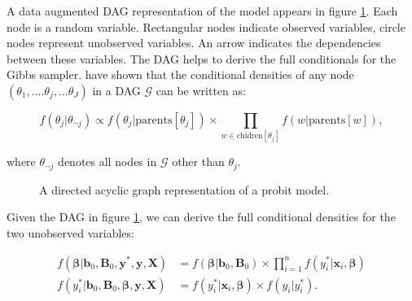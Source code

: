 \documentclass[11pt,a4paper]{article}
\newcommand{\f}{\mathit{f}}
\begin{document}
A data augmented DAG representation of the model appears in figure \ref{fig:ProbitDAG}. Each node is a random variable. Rectangular nodes indicate observed variables, circle nodes represent unobserved variables. An arrow indicates the dependencies between these variables. The DAG helps to derive the full conditionals for the Gibbs sampler. \citet{Lauritzen.et.al.1990} have shown that the conditional densities of any node $(\theta_1, .... \theta_j,...\theta_J)$ in a DAG $\mathcal{G}$ can be written as:

\begin{equation}
\f(\theta_j | \theta_{\neg j}) \propto \f(\theta_j | \mathrm{parents}[\theta_j]) \times \prod_{w \in \mathrm{chidren}[\theta_j]} \f(w|\mathrm{parents}[w]),
\end{equation}

where $\theta_{\neg j}$ denotes all nodes in $\mathcal{G}$ other than $\theta_j$. 


\begin{figure}[!ht]
\centering


\caption{A directed acyclic graph representation of a probit model.} \label{fig:ProbitDAG}
\end{figure}

\newpage 

Given the DAG in figure \ref{fig:ProbitDAG}, we can derive the full conditional densities for the two unobserved variables: 

\begin{equation}
\begin{split}
\f(\boldsymbol{\beta} | \mathbf{b}_0, \mathbf{B}_0, \mathbf{y}^{*}, \mathbf{y}, \mathbf{X} ) &= 
	\f(\boldsymbol{\beta} | \mathbf{b}_0, \mathbf{B}_0) \times \prod_{i=1}^{n} \f(y_i^{*}|\mathbf{x}_i, \boldsymbol{\beta})\\
\f( y_i^{*} | \mathbf{b}_0, \mathbf{B}_0, \boldsymbol{\beta}, \mathbf{y}, \mathbf{X} ) &= 
	\f(y^{*}_i | \mathbf{x}_i, \boldsymbol{\beta}) \times \f(y_i | y^{*}_i). 
\end{split}
\end{equation}
	
\end{document}
